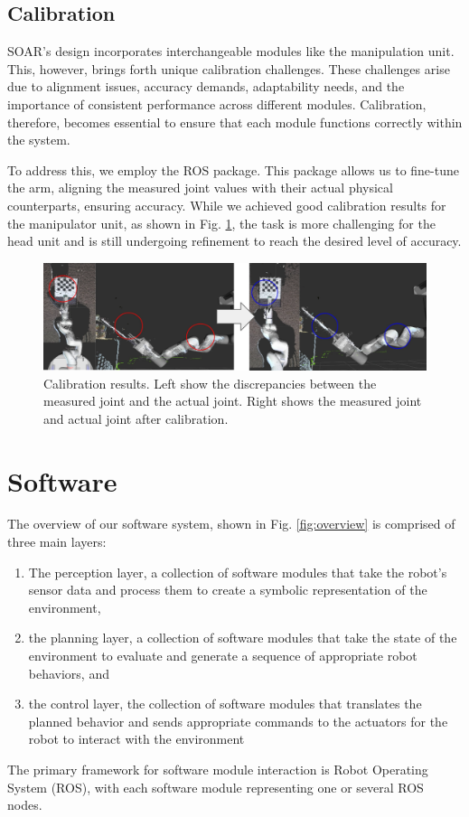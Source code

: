 \documentclass[runningheads,a4paper]{llncs}
\begin{document}
\subsection{Calibration}
SOAR’s design incorporates interchangeable modules like the manipulation unit.
This, however, brings forth unique calibration challenges.
These challenges arise due to alignment issues, accuracy demands, adaptability needs, and the importance of consistent performance across different modules.
Calibration, therefore, becomes essential to ensure that each module functions correctly within the system.

To address this, we employ the \cite{ferguson2015robust} ROS package.
This package allows us to fine-tune the arm, aligning the measured joint values with their actual physical counterparts, ensuring accuracy.
While we achieved good calibration results for the manipulator unit, as shown in Fig. \ref{fig:calibration}, the task is more challenging for the head unit and is still undergoing refinement to reach the desired level of accuracy.

\begin{figure}[tbp]
	\centering
	\includegraphics[width=1.0\linewidth]{images/calibration.png}
	\caption{Calibration results. Left show the discrepancies between the measured joint and the actual joint. Right shows the measured
		joint and actual joint after calibration.}
	\label{fig:calibration}
\end{figure}

\section{Software}
The overview of our software system, shown in Fig. \ref{fig:overview} is comprised of three main layers:
\begin{enumerate}
	\item The perception layer, a collection of software modules that take the robot’s sensor data and process them to create a symbolic representation of the environment,
	\item the planning layer, a collection of software modules that take the state of the environment to evaluate and generate a sequence of appropriate robot behaviors, and
	\item the control layer, the collection of software modules that translates the planned behavior and sends appropriate commands to the actuators for the robot to interact with the environment
\end{enumerate}
The primary framework for software module interaction is Robot Operating System (ROS), with each software module representing one or several ROS nodes.
\end{document}
